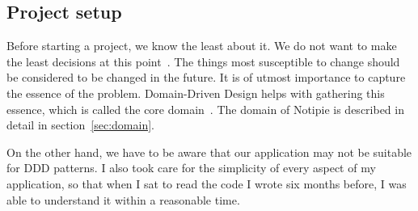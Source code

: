 \subsection{Project setup}\label{sec:project-setup}

Before starting a project,
we know the least about it.
We do not want to make the least decisions
at this point~\cite{beck_extreme_2004}.
The things most susceptible to change
should be considered to be changed in the future.
It is of utmost importance to capture
the essence of the problem.
Domain-Driven Design helps with
gathering this essence,
which is called
the core domain~\cite[Part~I, Chapter~3]{millett_patterns_2015}.
The domain of Notipie is described in detail
in section~\ref{sec:domain}.

On the other hand,
we have to be aware that our application
may not be suitable for DDD patterns.
I also took care for the simplicity
of every aspect of my application,
so that when I sat to read the code
I wrote six months before,
I was able to understand it
within a reasonable time.
